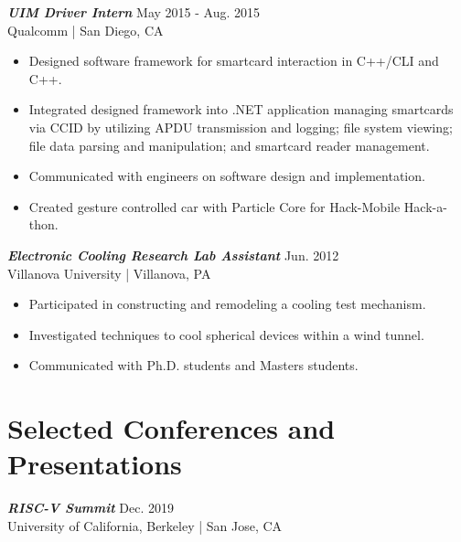 \documentclass[letter]{res}
\begin{document}
\begin{resume}
\vspace{-2mm}

{\sl \textbf{UIM Driver Intern}} \hfill May 2015 - Aug. 2015\\
Qualcomm | San Diego, CA \newline

 \vspace{-4mm}

 \begin{itemize}
 \item Designed software framework for smartcard interaction in C++/CLI and C++.
 \item Integrated designed framework into .NET application managing smartcards via CCID by utilizing APDU transmission and logging; file system viewing; file data parsing and manipulation; and smartcard reader management.
 \item Communicated with engineers on software design and implementation.
 \item Created gesture controlled car with Particle Core for Hack-Mobile Hack-a-thon.
 \end{itemize}

\vspace{-2mm}

{\sl \textbf{Electronic Cooling Research Lab Assistant}} \hfill Jun. 2012\\
Villanova University | Villanova, PA \newline

 \vspace{-4mm}

 \begin{itemize}
 \item Participated in constructing and remodeling a cooling test mechanism.
 \item Investigated techniques to cool spherical devices within a wind tunnel.
 \item Communicated with Ph.D. students and Masters students.
 \end{itemize}

\vspace{-4mm}

\section{Selected Conferences and Presentations}

{\sl \textbf{RISC-V Summit}} \hfill Dec. 2019\\
 University of California, Berkeley | San Jose, CA \newline


\end{resume}
\end{document}
